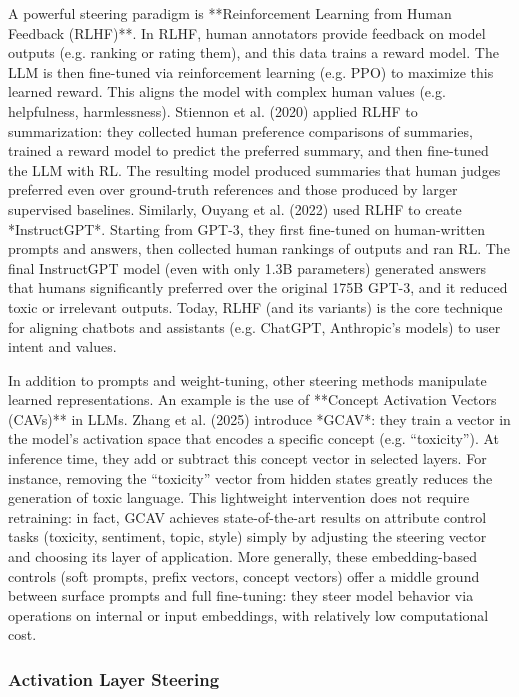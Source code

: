 A powerful steering paradigm is **Reinforcement Learning from Human Feedback (RLHF)**.  In RLHF, human annotators provide feedback on model outputs (e.g. ranking or rating them), and this data trains a reward model. The LLM is then fine-tuned via reinforcement learning (e.g. PPO) to maximize this learned reward.  This aligns the model with complex human values (e.g. helpfulness, harmlessness).  Stiennon et al. (2020) applied RLHF to summarization: they collected human preference comparisons of summaries, trained a reward model to predict the preferred summary, and then fine-tuned the LLM with RL. The resulting model produced summaries that human judges preferred even over ground-truth references and those produced by larger supervised baselines.  Similarly, Ouyang et al. (2022) used RLHF to create *InstructGPT*.  Starting from GPT-3, they first fine-tuned on human-written prompts and answers, then collected human rankings of outputs and ran RL.  The final InstructGPT model (even with only 1.3B parameters) generated answers that humans significantly preferred over the original 175B GPT-3, and it reduced toxic or irrelevant outputs.  Today, RLHF (and its variants) is the core technique for aligning chatbots and assistants (e.g. ChatGPT, Anthropic’s models) to user intent and values.

In addition to prompts and weight-tuning, other steering methods manipulate learned representations.  An example is the use of **Concept Activation Vectors (CAVs)** in LLMs.  Zhang et al. (2025) introduce *GCAV*: they train a vector in the model’s activation space that encodes a specific concept (e.g. “toxicity”).  At inference time, they add or subtract this concept vector in selected layers. For instance, removing the “toxicity” vector from hidden states greatly reduces the generation of toxic language.  This lightweight intervention does not require retraining: in fact, GCAV achieves state-of-the-art results on attribute control tasks (toxicity, sentiment, topic, style) simply by adjusting the steering vector and choosing its layer of application.  More generally, these embedding-based controls (soft prompts, prefix vectors, concept vectors) offer a middle ground between surface prompts and full fine-tuning: they steer model behavior via operations on internal or input embeddings, with relatively low computational cost.

\subsubsection{Activation Layer Steering}

